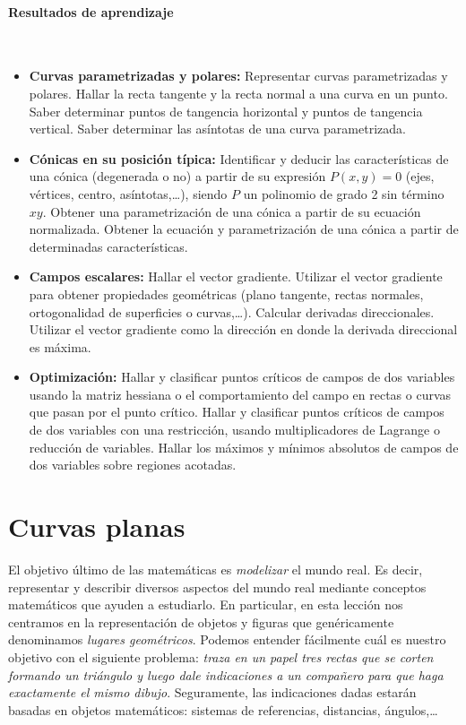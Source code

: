 \newpage
\paragraph{Resultados de aprendizaje}\ 

\vspace{-1em}
\begin{itemize}
\item
\textbf{Curvas parametrizadas y polares:}
Representar curvas parametrizadas y polares.
Hallar la recta tangente y la recta normal a una curva en un punto.
Saber determinar puntos de tangencia horizontal y puntos de tangencia vertical.
Saber determinar las asíntotas de una curva parametrizada.

\item
\textbf{Cónicas en su posición típica:}
Identificar y deducir las características de una cónica (degenerada o no) a partir de su expresión $P(x,y)=0$ (ejes, vértices, centro, asíntotas,\dots), siendo $P$ un polinomio de grado 2 sin término $xy$.
Obtener una parametrización de una cónica a partir de su ecuación normalizada.
Obtener la ecuación y parametrización de una cónica a partir de determinadas características.

\item
\textbf{Campos escalares:}
Hallar el vector gradiente.
Utilizar el vector gradiente para obtener propiedades geométricas (plano tangente, rectas normales, ortogonalidad de superficies o curvas,\dots).
Calcular derivadas direccionales.
Utilizar el vector gradiente como la dirección en donde la derivada direccional es máxima.

\item
\textbf{Optimización:}
Hallar y clasificar puntos críticos de campos de dos variables usando la matriz hessiana o el comportamiento del campo en rectas o curvas que pasan por el punto crítico.
Hallar y clasificar puntos críticos de campos de dos variables con una restricción, usando multiplicadores de Lagrange o reducción de variables.
Hallar los máximos y mínimos absolutos de campos de dos variables sobre regiones acotadas.
\end{itemize}

\newpage
\section{Curvas planas}\label{lec:curvas}%

El objetivo último de las matemáticas es \emph{modelizar} el mundo real. Es decir, representar y describir diversos aspectos del mundo real mediante conceptos matemáticos que ayuden a estudiarlo.
En particular, en esta lección nos centramos en la representación de objetos y figuras que genéricamente denominamos \emph{lugares geométricos}.
Podemos entender fácilmente cuál es nuestro objetivo con el siguiente problema:
\emph{traza en un papel tres rectas que se corten formando un triángulo y luego dale indicaciones a un compañero para que haga exactamente el mismo dibujo}.
Seguramente, las indicaciones dadas estarán basadas en objetos matemáticos: sistemas de referencias, distancias, ángulos,\dots

